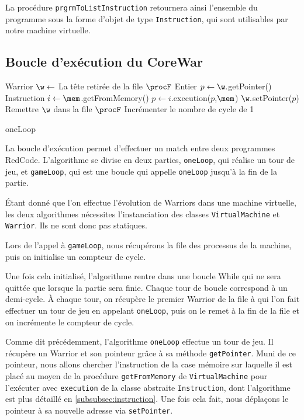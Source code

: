 \documentclass[hidelinks]{report}
\begin{document}
La procédure \texttt{prgrmToListInstruction} retournera ainsi l'ensemble du programme sous la forme d'objet de type \texttt{Instruction}, qui sont utilisables par notre machine virtuelle.

\subsection{Boucle d'exécution du CoreWar}
\LinesNumbered
\begin{algorithm}
\DontPrintSemicolon
{}
Warrior $\w \gets$ La tête retirée de la file $\procF$\;
Entier $p \gets \w.$getPointer()\; 
Instruction $i \gets \mem$.getFromMemory()\;
$p \gets i.$execution($p$,$\mem$)\;
$\w.$setPointer($p$)\;
Remettre $\w$ dans la file $\procF$\;
Incrémenter le nombre de cycle de 1\;
\caption{\sc oneLoop}
\label{algo:oneloop}
\end{algorithm}
La boucle d'exécution permet d'effectuer un match entre deux programmes RedCode. L'algorithme se divise en deux parties, \texttt{oneLoop}, qui réalise un tour de jeu, et \texttt{gameLoop}, qui est une boucle qui appelle \texttt{oneLoop} jusqu'à la fin de la partie.

Étant donné que l'on effectue l'évolution de Warriors dans une machine virtuelle, les deux algorithmes nécessites l'instanciation des classes \texttt{VirtualMachine} et \texttt{Warrior}. Ils ne sont donc pas statiques.

Lors de l'appel à \texttt{gameLoop}, nous récupérons la file des processus de la machine, puis on initialise un compteur de cycle.

Une fois cela initialisé, l'algorithme rentre dans une boucle While qui ne sera quittée que lorsque la partie sera finie. Chaque tour de boucle correspond à un demi-cycle.
À chaque tour, on récupère le premier Warrior de la file à qui l'on fait effectuer un tour de jeu en appelant \texttt{oneLoop}, puis on le remet à la fin de la file et on incrémente le compteur de cycle.

Comme dit précédemment, l'algorithme \texttt{oneLoop} effectue un tour de jeu. Il récupère un Warrior et son pointeur grâce à sa méthode \texttt{getPointer}. Muni de ce pointeur, nous allons chercher l'instruction de la case mémoire sur laquelle il est placé au moyen de la procédure \texttt{getFromMemory} de \texttt{VirtualMachine} pour l'exécuter avec \texttt{execution} de la classe abstraite \texttt{Instruction}, dont l'algorithme est plus détaillé en \autoref{subsubsec:instruction}. Une fois cela fait, nous déplaçons le pointeur à sa nouvelle adresse via \texttt{setPointer}.
\end{document}

